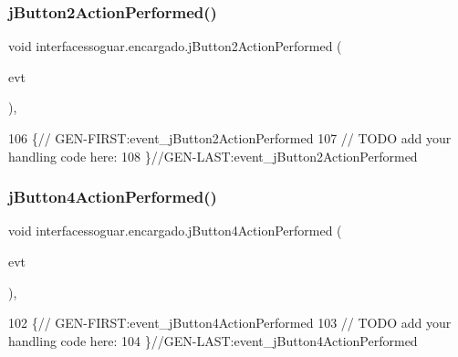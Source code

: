 \subsubsection{\texorpdfstring{j\+Button2\+Action\+Performed()}{jButton2ActionPerformed()}}
{\footnotesize\ttfamily void interfacessoguar.\+encargado.\+j\+Button2\+Action\+Performed (\begin{DoxyParamCaption}\item[{java.\+awt.\+event.\+Action\+Event}]{evt }\end{DoxyParamCaption})\hspace{0.3cm}{\ttfamily [inline]}, {\ttfamily [private]}}


\begin{DoxyCode}
106                                                                          \{\textcolor{comment}{//
      GEN-FIRST:event\_jButton2ActionPerformed}
107         \textcolor{comment}{// TODO add your handling code here:}
108     \}\textcolor{comment}{//GEN-LAST:event\_jButton2ActionPerformed}
\end{DoxyCode}
\mbox{\label{classinterfacessoguar_1_1encargado_a60322c297cc3f0d5c9cbc4ca4b896712}} 
\subsubsection{\texorpdfstring{j\+Button4\+Action\+Performed()}{jButton4ActionPerformed()}}
{\footnotesize\ttfamily void interfacessoguar.\+encargado.\+j\+Button4\+Action\+Performed (\begin{DoxyParamCaption}\item[{java.\+awt.\+event.\+Action\+Event}]{evt }\end{DoxyParamCaption})\hspace{0.3cm}{\ttfamily [inline]}, {\ttfamily [private]}}


\begin{DoxyCode}
102                                                                          \{\textcolor{comment}{//
      GEN-FIRST:event\_jButton4ActionPerformed}
103         \textcolor{comment}{// TODO add your handling code here:}
104     \}\textcolor{comment}{//GEN-LAST:event\_jButton4ActionPerformed}
\end{DoxyCode}
\mbox{\label{classinterfacessoguar_1_1encargado_aff744ed614e4511478a42b027606a6bf}} 
